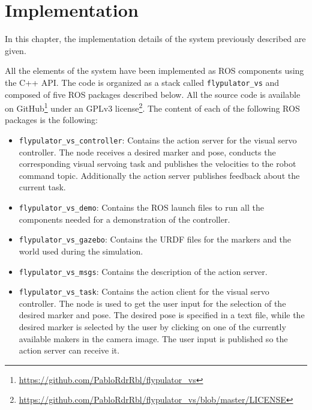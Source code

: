 
\chapter{Implementation}
\label{chap:implementation}

In this chapter, the implementation details of the system previously described are given.

All the elements of the system have been implemented as ROS components using the C++ API. The code is organized as a stack called \texttt{flypulator\_vs} and composed of five ROS packages described below. All the source code is available on GitHub\footnote{\url{https://github.com/PabloRdrRbl/flypulator_vs}} under an GPLv3 license\footnote{\url{https://github.com/PabloRdrRbl/flypulator_vs/blob/master/LICENSE}}. The content of each of the following ROS packages is the following:


\begin{itemize}
	\item \texttt{flypulator\_vs\_controller}: Contains the action server for the visual servo controller. The node receives a desired marker and pose, conducts the corresponding visual servoing task and publishes the velocities to the robot command topic. Additionally the action server publishes feedback about the current task.
	
	\item \texttt{flypulator\_vs\_demo}: Contains the ROS launch files to run all the components needed for a demonstration of the controller.
	
	\item \texttt{flypulator\_vs\_gazebo}: Contains the URDF files for the markers and the world used during the simulation.
	
	\item \texttt{flypulator\_vs\_msgs}: Contains the description of the action server.
	
	\item \texttt{flypulator\_vs\_task}: Contains the action client for the visual servo controller. The node is used to get the user input for the selection of the desired marker and pose. The desired pose is specified in a text file, while the desired marker is selected by the user by clicking on one of the currently available makers in the camera image. The user input is published so the action server can receive it.
\end{itemize}

